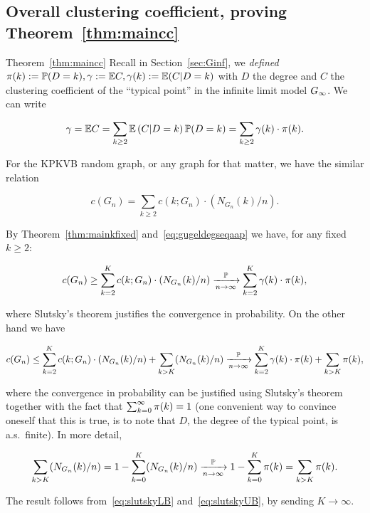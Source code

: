 \subsection{Overall clustering coefficient, proving Theorem~\ref{thm:maincc}}

% 
% 
% 


\begin{proofof}{Theorem~\ref{thm:maincc}}
Recall in Section~\ref{sec:Ginf},  we {\em defined} ${\pi}(k) := \mathbb{P}(D=k), \gamma := {\mathbb E} C, \gamma(k) := {\mathbb E}(C|D=k)$ with $D$ the degree
and $C$ the clustering coefficient of the ``typical point'' in the infinite limit model $G_{\infty}$. We can write

$$ \gamma = {\mathbb E} C = \sum_{k\geq 2} {\mathbb E}\left( C | D=k \right) \mathbb{P}( D=k ) = \sum_{k\geq 2} \gamma(k) \cdot {\pi}(k). $$

For the KPKVB random graph, or any graph for that matter, we have the similar relation

$$ c(G_n) = \sum_{k\geq 2} c(k;G_n) \cdot (N_{G_n}(k)/n). $$


By Theorem~\ref{thm:mainkfixed} and~\eqref{eq:gugeldegseqaap} we have, for any fixed $k\geq 2$:

\begin{equation}\label{eq:slutskyUB} 
 c(G_n) \geq \sum_{k=2}^K c(k;G_n) \cdot (N_{G_n}(k)/n) \xrightarrow[n\to\infty]{\mathbb{P}} \sum_{k=2}^K \gamma(k)\cdot {\pi}(k), 
\end{equation}

\noindent
where Slutsky's theorem justifies the convergence in probability.
On the other hand we have 

\begin{equation}\label{eq:slutskyLB} 
c(G_n) \leq \sum_{k=2}^K c(k;G_n) \cdot (N_{G_n}(k)/n) + \sum_{k>K} (N_{G_n}(k)/n)
\xrightarrow[n\to\infty]{\mathbb{P}} \sum_{k=2}^K \gamma(k)\cdot {\pi}(k) + \sum_{k>K} {\pi}(k), 
\end{equation}

\noindent
where the convergence in probability can be justified using Slutsky's theorem together 
with the fact that $\sum_{k=0}^\infty {\pi}(k) = 1$ (one convenient way to convince oneself that this is true, is to note that 
$D$, the degree of the typical point, is a.s.~finite). In more detail, 

$$\sum_{k>K} (N_{G_n}(k)/n) 
= 1 - \sum_{k=0}^K (N_{G_n}(k)/n) \xrightarrow[n\to\infty]{\mathbb{P}} 1 - \sum_{k=0}^K {\pi}(k) = \sum_{k>K} {\pi}(k). $$

The result follows from~\eqref{eq:slutskyLB} and~\eqref{eq:slutskyUB}, by sending $K\to\infty$. 
\end{proofof}



